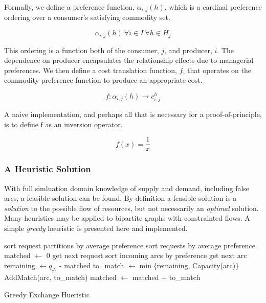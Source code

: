 Formally, we define a preference function, $\alpha_{i,j}(h)$, which is a
cardinal preference ordering over a consumer's satisfying commodity set.

\begin{equation}
\alpha_{i,j}(h) \: \forall i \in I \: \forall h \in H_{j} 
\end{equation}

This ordering is a function both of the consumer, $j$, and producer, $i$. The
dependence on producer encapsulates the relationship effects due to managerial
preferences. We then define a cost translation function, $f$, that operates on
the commodity preference function to produce an appropriate cost.

\begin{equation}
f : \alpha_{i,j}(h) \to c_{i,j}^{h}
\end{equation}

A naive implementation, and perhaps all that is necessary for a
proof-of-principle, is to define f as an inversion operator.

\begin{equation}
f(x) = \frac{1}{x}
\end{equation}

\subsubsection{A Heuristic Solution}

With full simluation domain knowledge of supply and demand, including false
arcs, a feasible solution can be found. By definition a feasible solution is a
\textit{solution} to the possible flow of resources, but not necessarily an
\textit{optimal} solution. Many heuristics may be applied to bipartite graphs
with constrainted flows. A simple \textit{greedy} heuristic is presented here
and implemented. 

\begin{algorithm}[h!]
 \SetAlgoLined
 sort request partitions by average preference\;
  {
   sort requests by average preference\;
   matched $\leftarrow$ 0\;        
    {
     get next request\;
     sort incoming arcs by preference\;
      {
       get next arc\;
       remaining $\leftarrow q_{J_r}$ - matched\;
       to\_match $\leftarrow \min \lbrace$remaining, Capacity(arc)$\rbrace$\;
       AddMatch(arc, to\_match)\;
       matched $\leftarrow$ matched + to\_match\;
     }
   }
 }
 \caption{Greedy Exchange Hueristic}\label{alg::greedy}
\end{algorithm}

